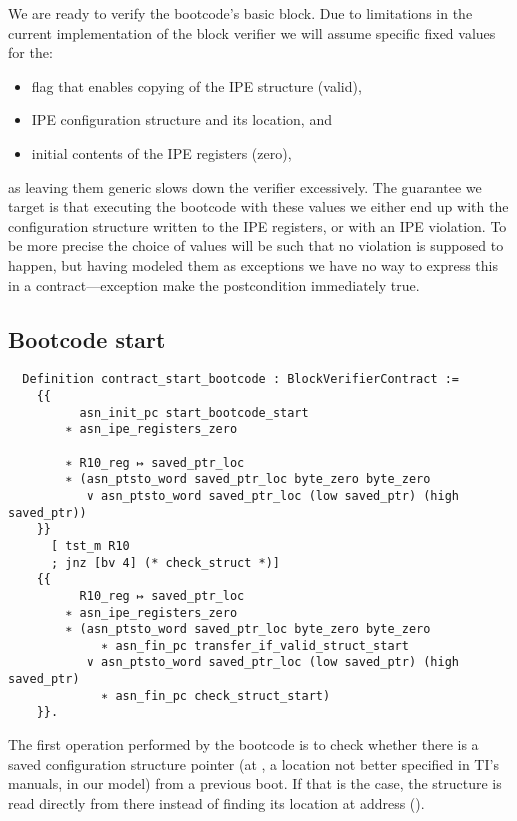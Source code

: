 We are ready to verify the bootcode's basic block. Due to limitations in the current implementation of the block verifier we will assume specific fixed values for the:
\begin{itemize}
\item flag that enables copying of the IPE structure (valid),
\item IPE configuration structure and its location, and
\item initial contents of the IPE registers (zero),
\end{itemize}
as leaving them generic slows down the verifier excessively. The guarantee we target is that executing the bootcode with these values we either end up with the configuration structure written to the IPE registers, or with an IPE violation. To be more precise the choice of values will be such that no violation is supposed to happen, but having modeled them as exceptions we have no way to express this in a contract---exception make the postcondition immediately true.


\subsection{Bootcode start}

\begin{verbatim}
  Definition contract_start_bootcode : BlockVerifierContract :=
    {{
          asn_init_pc start_bootcode_start
        ∗ asn_ipe_registers_zero

        ∗ R10_reg ↦ saved_ptr_loc
        ∗ (asn_ptsto_word saved_ptr_loc byte_zero byte_zero
           ∨ asn_ptsto_word saved_ptr_loc (low saved_ptr) (high saved_ptr))
    }}
      [ tst_m R10
      ; jnz [bv 4] (* check_struct *)]
    {{
          R10_reg ↦ saved_ptr_loc
        ∗ asn_ipe_registers_zero
        ∗ (asn_ptsto_word saved_ptr_loc byte_zero byte_zero
             ∗ asn_fin_pc transfer_if_valid_struct_start
           ∨ asn_ptsto_word saved_ptr_loc (low saved_ptr) (high saved_ptr)
             ∗ asn_fin_pc check_struct_start)
    }}.
\end{verbatim}

The first operation performed by the bootcode is to check whether there is a saved configuration structure pointer (at , a location not better specified in TI's manuals,  in our model) from a previous boot. If that is the case, the structure is read directly from there instead of finding its location at address  ().

